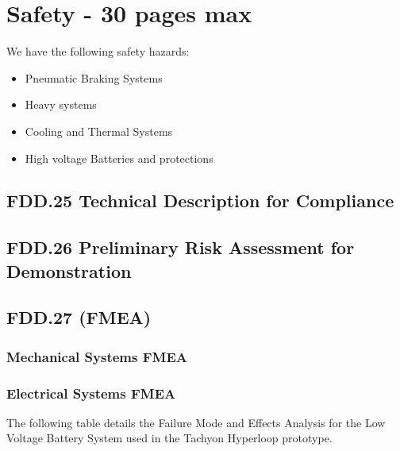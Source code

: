 \chapter{Safety - 30 pages max}
We have the following safety hazards:
\begin{itemize}
    \item Pneumatic Braking Systems
    \item Heavy systems
    \item Cooling and Thermal Systems 
    \item High voltage Batteries and protections
\end{itemize}
\section{FDD.25 Technical Description for Compliance}

\section{FDD.26 Preliminary Risk Assessment for Demonstration}

\section{FDD.27 (FMEA)}
\subsection{Mechanical Systems FMEA}
\subsection{Electrical Systems FMEA}

The following table details the Failure Mode and Effects Analysis for the Low Voltage Battery System used in the Tachyon Hyperloop prototype.

